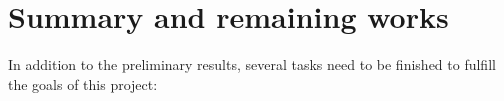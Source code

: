 \section{Summary and remaining works}
\label{sec:future_work}

In addition to the preliminary results, several tasks need to
be finished to fulfill the goals of this project:

